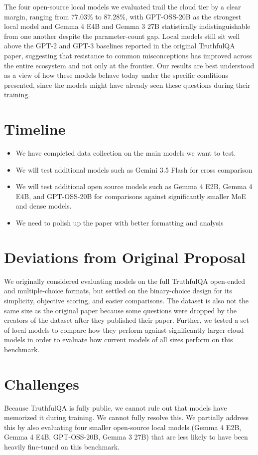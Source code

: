 \documentclass[11pt]{article}
\begin{document}
The four open-source local models we evaluated trail the cloud tier by a clear margin, ranging from 77.03\% to 87.28\%, with GPT-OSS-20B as the strongest local model and Gemma 4 E4B and Gemma 3 27B statistically indistinguishable
from one another despite the parameter-count gap. Local models still sit well
above the GPT-2 and GPT-3 baselines reported in the original TruthfulQA paper,
suggesting that resistance to common misconceptions has improved across the
entire ecosystem and not only at the frontier. Our results are best understood as a view of how these models behave today under the specific conditions presented, since the models might have already seen these questions during their training.


\section*{Timeline}
\begin{itemize}
    \item We have completed data collection on the main models we want to test.
    \item We will test additional models such as Gemini 3.5 Flash for cross comparison
    \item We will test additional open source models such as Gemma 4 E2B, Gemma 4 E4B, and GPT-OSS-20B for comparisons against significantly smaller MoE and dense models. 
    \item We need to polish up the paper with better formatting and analysis
\end{itemize}

\section*{Deviations from Original Proposal}
We originally considered evaluating models on the full TruthfulQA open-ended and multiple-choice formats, but settled on the binary-choice design for its simplicity, objective scoring, and easier comparisons. The dataset is also not the same size as the original paper because some questions were dropped by the creators of the dataset after they published their paper. Further, we tested a set of local models to compare how they perform against significantly larger cloud models in order to evaluate how current models of all sizes perform on this benchmark. 

\section*{Challenges}
Because TruthfulQA is fully public, we cannot rule out that models have memorized it during training. We cannot fully resolve this. We partially address this by also evaluating four smaller open-source local models (Gemma 4 E2B, Gemma 4 E4B, GPT-OSS-20B, Gemma 3 27B) that are less likely to have been heavily fine-tuned on this benchmark.
\end{document}
